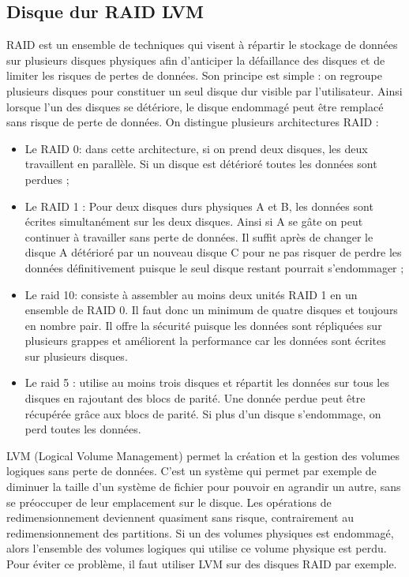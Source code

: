 \documentclass[a4paper,12pt,french]{report} %
\begin{document}
\subsection{Disque dur RAID LVM}
RAID est un ensemble de techniques qui visent à répartir le stockage de données sur plusieurs disques physiques afin d'anticiper la défaillance des disques et de limiter les risques de pertes de données. Son principe est simple : on regroupe plusieurs disques pour constituer un seul disque dur visible par l'utilisateur. Ainsi lorsque l'un des disques se détériore, le disque endommagé peut être remplacé sans risque de perte de données. On distingue plusieurs architectures RAID :
\begin{itemize}
	\item Le RAID 0: dans cette architecture, si on prend deux disques, les deux travaillent en parallèle. Si un disque est détérioré toutes les données sont perdues ;
	\item Le RAID 1 : Pour deux disques durs physiques A et B, les données sont écrites simultanément sur les deux disques. Ainsi si A se gâte on peut continuer à travailler sans perte de données. Il suffit après de changer le disque A détérioré par un nouveau disque C pour ne pas risquer de perdre les données définitivement puisque le seul disque restant pourrait s'endommager ;
	\item Le raid 10: consiste à assembler au moins deux unités RAID 1 en un ensemble de RAID 0. Il faut donc un minimum de quatre disques et toujours en nombre pair. Il offre la sécurité puisque les données sont répliquées sur plusieurs grappes et améliorent la performance car les données sont écrites sur plusieurs disques.%
	\item Le raid 5 : utilise au moins trois disques et répartit les données sur tous les disques en rajoutant des blocs de parité. Une donnée perdue peut être récupérée grâce aux blocs de parité. Si plus d'un disque s'endommage, on perd toutes les données. 
\end{itemize}

LVM (Logical Volume Management) permet la création et la gestion des volumes logiques sans perte de données. C'est un système qui permet par exemple de diminuer la taille d'un système de fichier pour pouvoir en agrandir un autre, sans se préoccuper de leur emplacement sur le disque. Les opérations de redimensionnement deviennent quasiment sans risque, contrairement au redimensionnement des partitions. Si un des volumes physiques est endommagé, alors l'ensemble des volumes logiques qui utilise ce volume physique est perdu. Pour éviter ce problème, il faut utiliser LVM sur des disques RAID par exemple.
\end{document}
